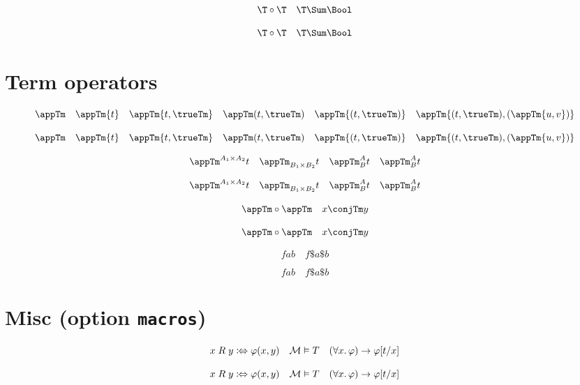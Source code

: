 \documentclass{article}
\def\termfont{\mathbf}
\begin{document}
\begin{verbatim*}
\[
\T \circ \T\quad
\T \Sum \Bool
\]
\end{verbatim*}
%
\[
  \T \circ \T\quad
  \T \Sum \Bool
\]

\section{Term operators}

\begin{verbatim*}
\def\termfont{\mathbf}

\DeclareTermInfix{\conjTm}{\wedge}
\end{verbatim*}

\begin{verbatim*}
\[
\appTm\quad
\appTm{t}\quad
\appTm{t,\trueTm}\quad
\appTm(t,\trueTm)\quad
\appTm{(t,\trueTm)}\quad
\appTm{(t,\trueTm),(\appTm{u,v})}
\]
\end{verbatim*}
%
\[
  \appTm              \quad
  \appTm{t}           \quad
  \appTm{t,\trueTm}   \quad
  \appTm(t,\trueTm)   \quad
  \appTm{(t,\trueTm)} \quad
  \appTm{(t,\trueTm),(\appTm{u,v})}
\]

\begin{verbatim*}
\[
\appTm^{A_1\times A_2}{t}\quad
\appTm_{B_1\times B_2}{t}\quad
\appTm^A_B{t}\quad
\appTm_B^A{t}
\]
\end{verbatim*}
%
\[
  \appTm^{A_1 \times A_2}{t} \quad
  \appTm_{B_1 \times B_2}{t} \quad
  \appTm^A_B{t}              \quad
  \appTm_B^A{t}
\]

\begin{verbatim*}
\[
\appTm\circ\appTm\quad
x\conjTm y
\]
\end{verbatim*}
%
\[
  \appTm \circ \appTm \quad
  x \conjTm y
\]

\begin{verbatim*}
\[
f a b\quad
f\$a\$b
\]
\end{verbatim*}
%
\[
  f a b \quad
  f\$a\$b
\]

\section{Misc (option \texttt{macros})}

\begin{verbatim*}
\[
x\mathrel{R}y\coloniff\varphi(x,y)\quad
\Mod[M]\vDash T\quad
(\forall x.\,\varphi)\rightarrow\Subst{t}[x]{\varphi}
\]
\end{verbatim*}
%
\[
  x \mathrel{R} y \coloniff \varphi(x,y) \quad
  \Mod[M] \vDash T \quad
  (\forall x.\,\varphi) \rightarrow \Subst{t}[x]{\varphi}
\]
\end{document}
